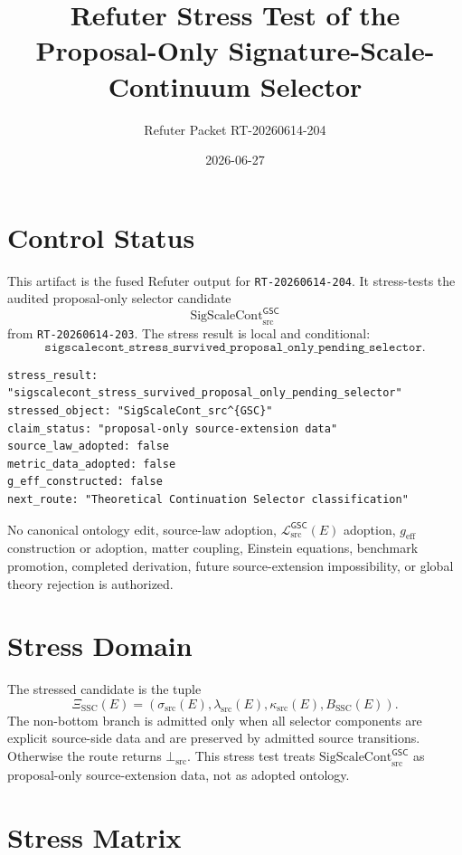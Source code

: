 \documentclass[11pt]{article}
\title{Refuter Stress Test of the Proposal-Only Signature-Scale-Continuum Selector}
\author{Refuter Packet RT-20260614-204}
\date{2026-06-27}
\newcommand{\MetricData}{\mathcal{L}_{\mathrm{src}}^{\mathsf{GSC}}}
\newcommand{\geff}{g_{\mathrm{eff}}}
\newcommand{\SigScaleCont}{\mathrm{SigScaleCont}_{\mathrm{src}}^{\mathsf{GSC}}}
\newcommand{\SigTok}{\sigma_{\mathrm{src}}}
\newcommand{\ScaleTok}{\lambda_{\mathrm{src}}}
\newcommand{\ContTok}{\kappa_{\mathrm{src}}}
\newcommand{\BottomSrc}{\bot_{\mathrm{src}}}
\begin{document}
\maketitle

\section{Control Status}

This artifact is the fused Refuter output for \texttt{RT-20260614-204}. It
stress-tests the audited proposal-only selector candidate
\[
  \SigScaleCont
\]
from \texttt{RT-20260614-203}. The stress result is local and conditional:
\[
  \texttt{sigscalecont\_stress\_survived\_proposal\_only\_pending\_selector}.
\]

\begin{verbatim}
stress_result: "sigscalecont_stress_survived_proposal_only_pending_selector"
stressed_object: "SigScaleCont_src^{GSC}"
claim_status: "proposal-only source-extension data"
source_law_adopted: false
metric_data_adopted: false
g_eff_constructed: false
next_route: "Theoretical Continuation Selector classification"
\end{verbatim}

No canonical ontology edit, source-law adoption, \(\MetricData(E)\) adoption,
\(\geff\) construction or adoption, matter coupling, Einstein equations,
benchmark promotion, completed derivation, future source-extension
impossibility, or global theory rejection is authorized.

\section{Stress Domain}

The stressed candidate is the tuple
\[
  \Xi_{\mathrm{SSC}}(E)
  =
  (\SigTok(E),\ScaleTok(E),\ContTok(E),B_{\mathrm{SSC}}(E)).
\]
The non-bottom branch is admitted only when all selector components are
explicit source-side data and are preserved by admitted source transitions.
Otherwise the route returns \(\BottomSrc\). This stress test treats
\(\SigScaleCont\) as proposal-only source-extension data, not as adopted
ontology.

\section{Stress Matrix}
\end{document}
